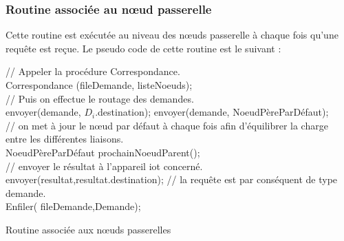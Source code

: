 \subsubsection{Routine associée au nœud passerelle}
Cette routine est exécutée au niveau des nœuds passerelle à chaque fois qu’une requête est reçue.
Le pseudo code de cette routine est le suivant :\\
\begin{algorithm}[H]
 {  
    // Appeler la  procédure Correspondance.\\
    Correspondance (fileDemande, listeNoeuds);\\
    // Puis on effectue le routage des demandes.\\
   {
     {envoyer(demande, $D_i$.destination);}
     {
         envoyer(demande, NoeudPèreParDéfaut);\\
        // on met à jour le nœud par défaut à chaque fois afin d'équilibrer la charge entre les différentes liaisons.\\
	    NoeudPèreParDéfaut \gets prochainNoeudParent();\\
     }
   }
 }
 {
   {// envoyer le résultat à l'appareil iot concerné.\\
       {envoyer(resultat,resultat.destination);}
   }
   {// la requête est par conséquent de type demande.\\
     Enfiler( fileDemande,Demande);
   }
 }
 \caption{Routine associée aux nœuds passerelles\\ \\}
\end{algorithm}
